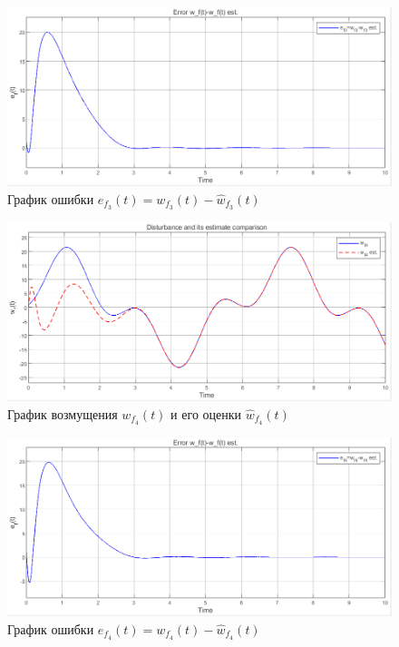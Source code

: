 \documentclass[a4paper, 12pt]{article}
\begin{document}
    \begin{figure}[H]
        \centering
        \includegraphics[scale=0.6]{2task_ef3.png}
        \captionsetup{skip=0pt}
        \caption{График ошибки $e_{f_3}(t)=w_{f_3}(t)-\hat{w}_{f_3}(t)$}
        \label{fig:2task_ef3}
    \end{figure}
    \begin{figure}[H]
        \centering
        \includegraphics[scale=0.6]{2task_wfhwf4.png}
        \captionsetup{skip=0pt}
        \caption{График возмущения $w_{f_4}(t)$ и его оценки $\hat{w}_{f_4}(t)$}
        \label{fig:2task_wfhwf4}
    \end{figure}
    \begin{figure}[H]
        \centering
        \includegraphics[scale=0.6]{2task_ef4.png}
        \captionsetup{skip=0pt}
        \caption{График ошибки $e_{f_4}(t)=w_{f_4}(t)-\hat{w}_{f_4}(t)$}
        \label{fig:2task_ef4}
    \end{figure}
\end{document}
